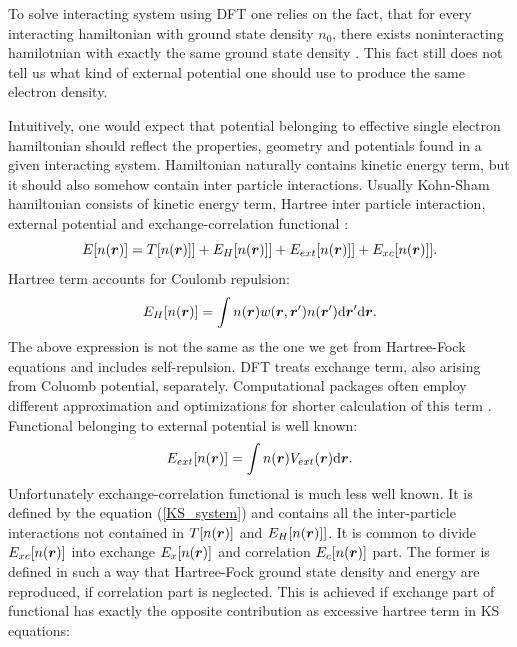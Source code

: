 \documentclass[openany, longbibliography,slovene,a4paper,12pt]{article}
\def\vec#1{\mbox{\boldmath$#1$}}
\newcommand{\dif}{\mathrm{d}}
\begin{document}
To solve interacting system using DFT one relies on the fact, that for every
interacting hamiltonian with ground state density $n_0$, there exists
noninteracting hamilotnian with exactly the same ground state density \cite{advanced_course}.
This fact still does not tell us what kind of external potential
one should use to produce the same electron density.

Intuitively, one would expect that potential belonging to effective single
electron hamiltonian should reflect the properties, geometry and potentials found
in a given interacting system. Hamiltonian naturally contains kinetic energy
term, but it should also somehow contain inter particle interactions. Usually
Kohn-Sham hamiltonian consists of kinetic energy term, Hartree inter particle
interaction, external potential and exchange-correlation functional \cite{advanced_course}:
\begin{equation} \label{KS_system}
  E[n(\vec r)]=T[n(\vec r)]] + E_H[n(\vec r)]] + E_{ext}[n(\vec r)]] + E_{xc}[n(\vec r)]].
\end{equation}
Hartree term accounts for Coulomb repulsion:
\begin{equation} \label{hartree_term1}
  E_H[n(\vec r)] = \int n(\vec r)w(\vec r, \vec r') n(\vec r')\dif \vec r' \dif \vec r.
\end{equation}
The above expression is not the same as the one we get from Hartree-Fock
equations and includes self-repulsion. DFT treats exchange term, also arising
from Coluomb potential, separately. Computational packages often employ different
approximation and optimizations for shorter calculation of this term \cite{orca}.
Functional belonging to external potential is well known: 
\begin{equation} \label{ext_potential_functional}
  E_{ext}[n(\vec r)] = \int n(\vec r) V_{ext}(\vec r) \dif \vec r.
\end{equation}
Unfortunately exchange-correlation functional is much less well known. It is
defined by the equation (\ref{KS_system}) and contains all the inter-particle
interactions not contained in $T[n(\vec r)]$ and $ E_H[n(\vec r)]]$. It is
common to divide $E_{xc}[n(\vec r)]$ into exchange $E_x[n(\vec r)]$ and
correlation $E_c[n(\vec r)]$ part. The former is defined in such a way that
Hartree-Fock ground state density and energy are reproduced, if correlation part
is neglected. This is achieved if exchange part of functional has exactly the
opposite contribution as excessive hartree term in KS equations: 
\end{document}
